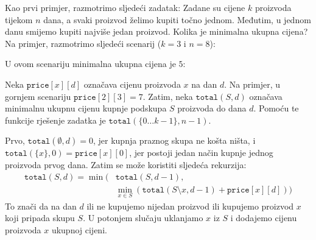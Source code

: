 Kao prvi primjer, razmotrimo sljedeći zadatak:
Zadane su cijene $k$ proizvoda
tijekom $n$ dana, a svaki proizvod želimo kupiti
točno jednom.
Međutim, u jednom danu smijemo kupiti najviše jedan
proizvod.
Kolika je minimalna ukupna cijena?
Na primjer, razmotrimo sljedeći scenarij ($k=3$ i $n=8$):
\begin{center}
\end{center}
U ovom scenariju minimalna ukupna cijena je $5$:
\begin{center}
\end{center}

Neka $\texttt{price}[x][d]$ označava cijenu proizvoda $x$
na dan $d$.
Na primjer, u gornjem scenariju $\texttt{price}[2][3] = 7$.
Zatim, neka $\texttt{total}(S,d)$ označava minimalnu ukupnu
cijenu kupnje podskupa $S$ proizvoda do dana $d$.
Pomoću te funkcije rješenje zadatka je
$\texttt{total}(\{0 \ldots k-1\},n-1)$.

Prvo, $\texttt{total}(\emptyset,d) = 0$,
jer kupnja praznog skupa ne košta ništa,
i $\texttt{total}(\{x\},0) = \texttt{price}[x][0]$,
jer postoji jedan način kupnje jednog proizvoda prvog dana.
Zatim se može koristiti sljedeća rekurzija:
\begin{equation*}
\begin{split}
\texttt{total}(S,d) = \min( & \texttt{total}(S,d-1), \\
& \min_{x \in S} (\texttt{total}(S \setminus x,d-1)+\texttt{price}[x][d]))
\end{split}
\end{equation*}
To znači da na dan $d$ ili ne kupujemo nijedan proizvod
ili kupujemo proizvod $x$ koji pripada skupu $S$.
U potonjem slučaju uklanjamo $x$ iz $S$ i dodajemo
cijenu proizvoda $x$ ukupnoj cijeni.

